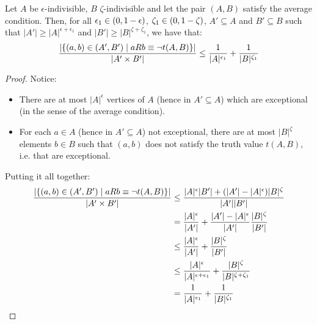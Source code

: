     \begin{lemma}[Claim 4.8] \label{lem:exceptions_bound_of_epsilon_indivisible_sets}
        Let $A$ be $\epsilon$-indivisible, $B$ $\zeta$-indivisible and let the pair $(A,B)$ satisfy the average condition.
        Then, for all $\epsilon_1 \in ( 0, 1-\epsilon )$, $\zeta_1 \in ( 0, 1-\zeta )$, $A' \subseteq A$
            and $B' \subseteq B$ such that $|A'| \geq |A|^{\epsilon + \epsilon_1}$ and $|B'| \geq |B|^{\zeta + \zeta_1}$,
            we have that:
        \[
            \frac{|\{ (a,b) \in (A',B') \mid a R b \equiv \neg t(A,B) \}|}{|A' \times B'|} \leq
                \frac{1}{|A|^{\epsilon_1}} + \frac{1}{|B|^{\zeta_1}}
        \]
        \begin{proof}
            Notice:
            \begin{itemize}
                \item There are at most $|A|^\epsilon$ vertices of $A$ (hence in $A' \subseteq A$) which are exceptional
                    (in the sense of the average condition).
                \item For each $a \in A$ (hence in $A' \subseteq A$) not exceptional, there are at most $|B|^\zeta$ elements
                    $b \in B$ such that $(a,b)$ does not satisfy the truth value $t(A,B)$, i.e. that are exceptional.
            \end{itemize}
            Putting it all together:
            \[
                \begin{split}
                    \frac{|\{ (a,b) \in (A',B') \mid a R b \equiv \neg t(A,B) \}|}{|A' \times B'|}
                        &\leq \frac{|A|^\epsilon |B'| + (|A'| - |A|^\epsilon) |B|^\zeta}{|A'| |B'|} \\
                        &= \frac{|A|^\epsilon}{|A'|} + \frac{|A'| - |A|^\epsilon}{|A'|} \frac{|B|^\zeta}{|B'|} \\
                        &\leq \frac{|A|^\epsilon}{|A'|} + \frac{|B|^\zeta}{|B'|} \\
                        &\leq \frac{|A|^\epsilon}{|A|^{\epsilon + \epsilon_1}} + \frac{|B|^\zeta}{|B|^{\zeta + \zeta_1}} \\
                        &= \frac{1}{|A|^{\epsilon_1}} + \frac{1}{|B|^{\zeta_1}}
                \end{split}
            \]
        \end{proof}
    \end{lemma}

